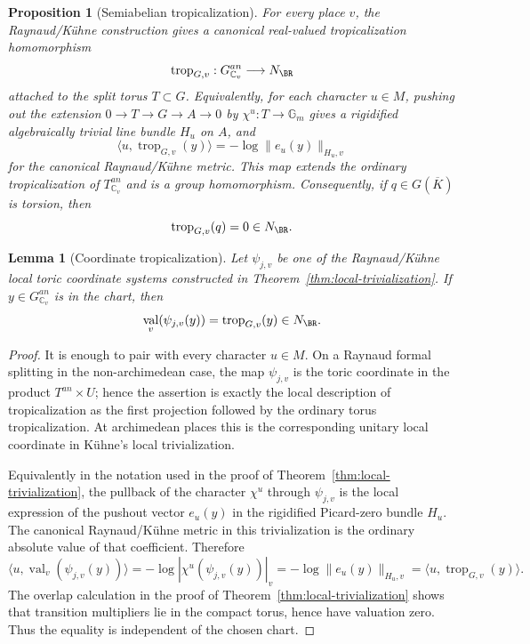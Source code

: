 \documentclass[10pt,a4paper]{amsart}
\theoremstyle{plain}
\newtheorem{lemma}[theorem]{Lemma}
\newtheorem{proposition}[theorem]{Proposition}
\DeclareMathOperator{\val}{val}
\theoremstyle{plain}
\numberwithin{equation}{section}
\begin{document}
\begin{proposition}[Semiabelian tropicalization]
	\label{input:torsion-tropicalization}
	For every place \(v\), the Raynaud/K\"uhne construction gives a canonical
	real-valued tropicalization homomorphism
	\[
	\operatorname{trop}_{G,v}:G^{an}_{\mathbb C_v}\longrightarrow N_{\BR}
	\]
	attached to the split torus \(T\subset G\).  Equivalently, for each character
	\(u\in M\), pushing out the extension \(0\to T\to G\to A\to0\) by
	\(\chi^u:T\to\mathbb G_m\) gives a rigidified algebraically trivial line bundle
	\(H_u\) on \(A\), and
	\[
	\langle u,\operatorname{trop}_{G,v}(y)\rangle
	=-\log\|e_u(y)\|_{H_u,v}
	\]
	for the canonical Raynaud/K\"uhne metric.  This map extends the ordinary
	tropicalization of \(T^{an}_{\mathbb C_v}\) and is a group homomorphism.
	Consequently, if \(q\in G(\overline K)\) is torsion, then
	\[
	\operatorname{trop}_{G,v}(q)=0\in N_{\BR}.
	\]
\end{proposition}

\begin{lemma}[Coordinate tropicalization]
	\label{lem:local-coordinates-compute-tropicalization}
	Let \(\psi_{j,v}\) be one of the Raynaud/K\"uhne local toric coordinate systems
	constructed in Theorem~\ref{thm:local-trivialization}.  If \(y\in
	G^{an}_{\mathbb C_v}\) is in the chart, then
	\[
	\val_v(\psi_{j,v}(y))=\operatorname{trop}_{G,v}(y)\in N_{\BR}.
	\]
\end{lemma}

\begin{proof}
	It is enough to pair with every character \(u\in M\).  On a Raynaud formal
	splitting in the non-archimedean case, the map \(\psi_{j,v}\) is the toric
	coordinate in the product \(T^{an}\times U\); hence the assertion is exactly the
	local description of tropicalization as the first projection followed by the
	ordinary torus tropicalization.  At archimedean places this is the corresponding
	unitary local coordinate in K\"uhne's local trivialization.
	
	Equivalently in the notation used in the proof of
	Theorem~\ref{thm:local-trivialization}, the pullback of the character
	\(\chi^u\) through \(\psi_{j,v}\) is the local expression of the pushout vector
	\(e_u(y)\) in the rigidified Picard-zero bundle \(H_u\).  The canonical
	Raynaud/K\"uhne metric in this trivialization is the ordinary absolute value of
	that coefficient.  Therefore
	\[
	\bigl\langle u,\val_v(\psi_{j,v}(y))\bigr\rangle
	=-\log|\chi^u(\psi_{j,v}(y))|_v
	=-\log\|e_u(y)\|_{H_u,v}
	=\bigl\langle u,\operatorname{trop}_{G,v}(y)\bigr\rangle .
	\]
	The overlap calculation in the proof of
	Theorem~\ref{thm:local-trivialization} shows that transition multipliers lie in
	the compact torus, hence have valuation zero.  Thus the equality is independent
	of the chosen chart.
\end{proof}
\end{document}
